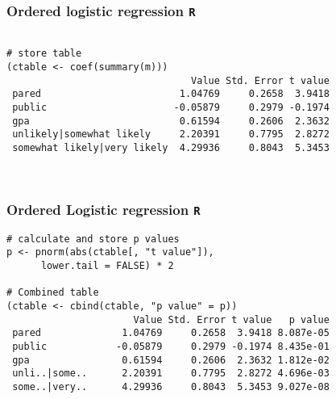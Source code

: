 \documentclass[00-GLMregslides.tex]{subfiles}
\begin{document}
\begin{frame}[fragile]
\frametitle{Ordered logistic regression \texttt{R} }
\normalsize
\begin{verbatim}
		
# store table
(ctable <- coef(summary(m)))
                                Value Std. Error t value
 pared                        1.04769     0.2658  3.9418
 public                      -0.05879     0.2979 -0.1974
 gpa                          0.61594     0.2606  2.3632
 unlikely|somewhat likely     2.20391     0.7795  2.8272
 somewhat likely|very likely  4.29936     0.8043  5.3453
 
 

\end{verbatim}

\end{frame}
\begin{frame}[fragile]
	\frametitle{Ordered Logistic regression \texttt{R} }
\normalsize	
	\begin{verbatim}
# calculate and store p values
p <- pnorm(abs(ctable[, "t value"]), 
      lower.tail = FALSE) * 2

# Combined table
(ctable <- cbind(ctable, "p value" = p))
                      Value Std. Error t value   p value
 pared              1.04769     0.2658  3.9418 8.087e-05
 public            -0.05879     0.2979 -0.1974 8.435e-01
 gpa                0.61594     0.2606  2.3632 1.812e-02
 unli..|some..      2.20391     0.7795  2.8272 4.696e-03
 some..|very..      4.29936     0.8043  5.3453 9.027e-08
\end{verbatim}

\end{frame} 

\end{document}
